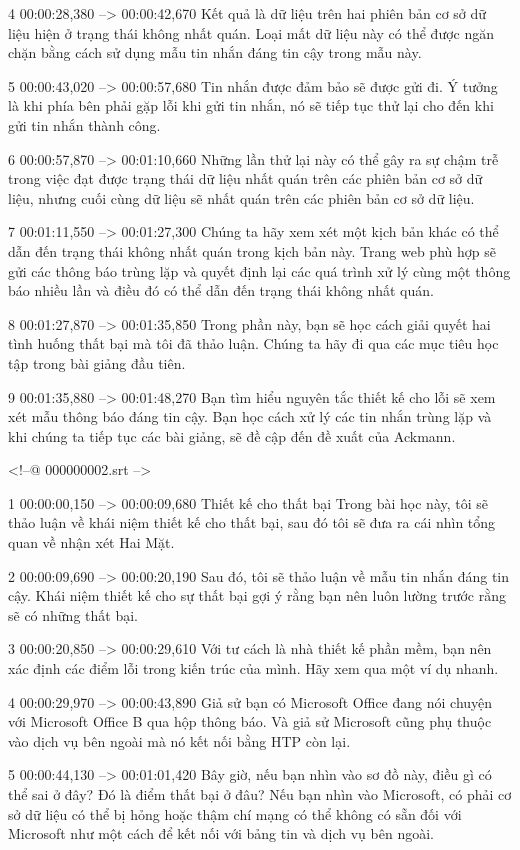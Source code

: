 4
00:00:28,380 --> 00:00:42,670
Kết quả là dữ liệu trên hai phiên bản cơ sở dữ liệu hiện ở trạng thái không nhất quán.  Loại mất dữ liệu này có thể được ngăn chặn bằng cách sử dụng mẫu tin nhắn đáng tin cậy trong mẫu này.

5
00:00:43,020 --> 00:00:57,680
Tin nhắn được đảm bảo sẽ được gửi đi.  Ý tưởng là khi phía bên phải gặp lỗi khi gửi tin nhắn, nó sẽ tiếp tục thử lại cho đến khi gửi tin nhắn thành công.

6
00:00:57,870 --> 00:01:10,660
Những lần thử lại này có thể gây ra sự chậm trễ trong việc đạt được trạng thái dữ liệu nhất quán trên các phiên bản cơ sở dữ liệu, nhưng cuối cùng dữ liệu sẽ nhất quán trên các phiên bản cơ sở dữ liệu.

7
00:01:11,550 --> 00:01:27,300
Chúng ta hãy xem xét một kịch bản khác có thể dẫn đến trạng thái không nhất quán trong kịch bản này.  Trang web phù hợp sẽ gửi các thông báo trùng lặp và quyết định lại các quá trình xử lý cùng một thông báo nhiều lần và điều đó có thể dẫn đến trạng thái không nhất quán.

8
00:01:27,870 --> 00:01:35,850
Trong phần này, bạn sẽ học cách giải quyết hai tình huống thất bại mà tôi đã thảo luận.  Chúng ta hãy đi qua các mục tiêu học tập trong bài giảng đầu tiên.

9
00:01:35,880 --> 00:01:48,270
Bạn tìm hiểu nguyên tắc thiết kế cho lỗi sẽ xem xét mẫu thông báo đáng tin cậy.  Bạn học cách xử lý các tin nhắn trùng lặp và khi chúng ta tiếp tục các bài giảng, sẽ đề cập đến đề xuất của Ackmann.

<!--@ 000000002.srt -->

1
00:00:00,150 --> 00:00:09,680
Thiết kế cho thất bại Trong bài học này, tôi sẽ thảo luận về khái niệm thiết kế cho thất bại, sau đó tôi sẽ đưa ra cái nhìn tổng quan về nhận xét Hai Mặt.

2
00:00:09,690 --> 00:00:20,190
Sau đó, tôi sẽ thảo luận về mẫu tin nhắn đáng tin cậy.  Khái niệm thiết kế cho sự thất bại gợi ý rằng bạn nên luôn lường trước rằng sẽ có những thất bại.

3
00:00:20,850 --> 00:00:29,610
Với tư cách là nhà thiết kế phần mềm, bạn nên xác định các điểm lỗi trong kiến ​​trúc của mình.  Hãy xem qua một ví dụ nhanh.

4
00:00:29,970 --> 00:00:43,890
Giả sử bạn có Microsoft Office đang nói chuyện với Microsoft Office B qua hộp thông báo.  Và giả sử Microsoft cũng phụ thuộc vào dịch vụ bên ngoài mà nó kết nối bằng HTP còn lại.

5
00:00:44,130 --> 00:01:01,420
Bây giờ, nếu bạn nhìn vào sơ đồ này, điều gì có thể sai ở đây?  Đó là điểm thất bại ở đâu?  Nếu bạn nhìn vào Microsoft, có phải cơ sở dữ liệu có thể bị hỏng hoặc thậm chí mạng có thể không có sẵn đối với Microsoft như một cách để kết nối với bảng tin và dịch vụ bên ngoài.

